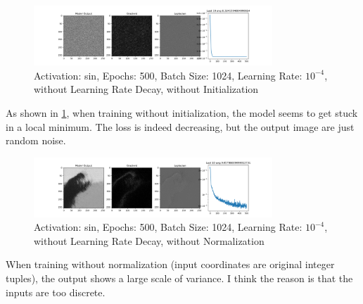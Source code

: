 \documentclass[12pt]{article}
\begin{document}
\subsection{}
\begin{figure}[H]
    \centering
    \includegraphics[width=0.8\textwidth]{imgs/siren_sin_e500_b1024_lr10-4_decay_noinit.png}
    \caption{Activation: sin, Epochs: 500, Batch Size: 1024, Learning Rate: $10^{-4}$, without Learning Rate Decay, without Initialization}
    \label{fig:5-7-sin-no-init}
\end{figure}
As shown in \ref{fig:5-7-sin-no-init}, when training without initialization, the model seems to get stuck in a local minimum. The loss is indeed decreasing, but the output image are just random noise. 

\begin{figure}[H]
    \centering
    \includegraphics[width=0.8\textwidth]{imgs/siren_sin_e500_b1024_lr10-4_decay_nonorm.png}
    \caption{Activation: sin, Epochs: 500, Batch Size: 1024, Learning Rate: $10^{-4}$, without Learning Rate Decay, without Normalization}
    \label{fig:5-7-sin-no-norm}
\end{figure}
When training without normalization (input coordinates are original integer tuples), the output shows a large scale of variance. I think the reason is that the inputs are too discrete.
\end{document}
